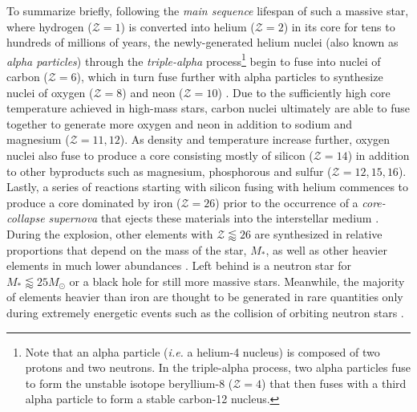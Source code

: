 To summarize briefly, following the \emph{main sequence} lifespan of such a massive star, where hydrogen ($\mathcal{Z}=1$) is converted into helium ($\mathcal{Z}=2$) in its core for tens to hundreds of millions of years, the newly-generated helium nuclei (also known as \emph{alpha particles}) through the \emph{triple-alpha} process\footnote{Note that an alpha particle (\emph{i.e.} a helium-4 nucleus) is composed of two protons and two neutrons. In the triple-alpha process, two alpha particles fuse to form the unstable isotope beryllium-8 ($\mathcal{Z}=4$) that then fuses with a third alpha particle to form a stable carbon-12 nucleus.} begin to fuse into nuclei of carbon ($\mathcal{Z}=6$), which in turn fuse further with alpha particles to synthesize nuclei of oxygen ($\mathcal{Z}=8$) and neon ($\mathcal{Z}=10$) \cite{Rolfs88,Carroll07}. 
Due to the sufficiently high core temperature achieved in high-mass stars, carbon nuclei ultimately are able to fuse together to generate more oxygen and neon in addition to sodium and magnesium ($\mathcal{Z}=11,12$). 
As density and temperature increase further, oxygen nuclei also fuse to produce a core consisting mostly of silicon ($\mathcal{Z}=14$) in addition to other byproducts such as magnesium, phosphorous and sulfur ($\mathcal{Z}=12,15,16$). 
Lastly, a series of reactions starting with silicon fusing with helium commences to produce a core dominated by iron ($\mathcal{Z}=26$) prior to the occurrence of a \emph{core-collapse supernova} that ejects these materials into the interstellar medium \cite{Rolfs88,Carroll07,Ryden10}.
During the explosion, other elements with $\mathcal{Z} \lessapprox 26$ are synthesized in relative proportions that depend on the mass of the star, $M_{*}$, as well as other heavier elements in much lower abundances \cite{Woosley86,Rolfs88}. 
Left behind is a neutron star for $M_{*} \lessapprox 25 M_{\odot}$ or a black hole for still more massive stars. 
Meanwhile, the majority of elements heavier than iron are thought to be generated in rare quantities only during extremely energetic events such as the collision of orbiting neutron stars \cite{Kasen17}. 

